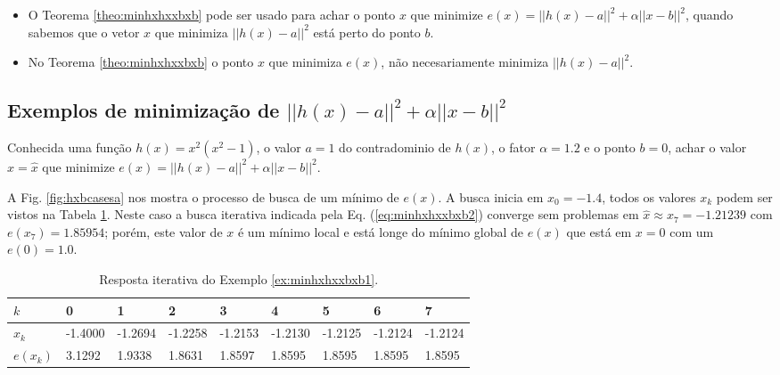 \begin{tcbattention}
\begin{itemize}
\item O Teorema \ref{theo:minhxhxxbxb} pode ser usado para achar o ponto $x$
que minimize $e(x)=||h(x)-a||^2+\alpha||x-b||^2$,
quando sabemos que o vetor $x$ que minimiza $||h(x)-a||^2$ 
está perto do ponto $b$.
\item No Teorema \ref{theo:minhxhxxbxb} o ponto $x$ que minimiza $e(x)$, 
não necesariamente minimiza  $||h(x)-a||^2$.
\end{itemize}
\end{tcbattention}


\subsection{Exemplos de minimização de $||h(x)-a||^2+\alpha ||x-b||^2$}


\begin{example}\label{ex:minhxhxxbxb1}
Conhecida uma função $h(x)=x^2(x^2-1)$, o valor $a=1$ do contradominio de $h(x)$,
o fator $\alpha=1.2$ e o ponto $b=0$,
achar o valor $x=\hat{x}$ que minimize $e(x)=||h(x)-a||^2+\alpha||x-b||^2$.
\end{example}
\begin{SolutionT}\label{sol:minhxhxxbxb1}


 A Fig. \ref{fig:hxbcasesa} nos mostra o processo de busca de um mínimo
 de $e(x)$. A busca inicia em $x_0=-1.4$,
 todos os valores $x_{k}$ podem ser vistos na Tabela \ref{tab:hxbcases1}. 
Neste caso a busca iterativa indicada pela Eq. (\ref{eq:minhxhxxbxb2}) converge sem problemas 
em $\hat{x}\approx x_7 =-1.21239$ com $e(x_7)=1.85954$; porém, 
 este valor de $x$ é um mínimo local e está longe do mínimo
 global de  $e(x)$ que está em $x=0$ com um $e(0)=1.0$.

\end{SolutionT}



\begin{table}[!h]
\centering
\begin{tabular}{|l|l|l|l|l|l|l|l|l|}
\hline
$k$      & 0 & 1 & 2 & 3 & 4 & 5 & 6 & 7 \\ \hline
$x_k$    & -1.4000 & -1.2694 & -1.2258 & -1.2153 & -1.2130 & -1.2125 & -1.2124 & -1.2124 \\ \hline
$e(x_k)$ & 3.1292 & 1.9338 & 1.8631 & 1.8597 & 1.8595 & 1.8595 & 1.8595 & 1.8595 \\ \hline
\end{tabular}
\caption{Resposta iterativa do Exemplo \ref{ex:minhxhxxbxb1}.}
\label{tab:hxbcases1}
\end{table}

